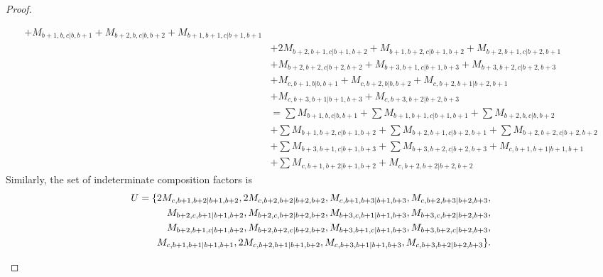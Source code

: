 \begin{proof}
\begin{enumerate}
\begin{enumerate}
\begin{equation}
\begin{aligned}
+ M_{b+1,b,c|b,b+1}
+ M_{b+2,b,c|b,b+2}
+ M_{b+1,b+1,c|b+1,b+1}\\
                                              &
+ 2M_{b+2,b+1,c|b+1,b+2}
+ M_{b+1,b+2,c|b+1,b+2}
+ M_{b+2,b+1,c|b+2,b+1}\\
                                              &
+ M_{b+2,b+2,c|b+2,b+2}
+ M_{b+3,b+1,c|b+1,b+3}
+ M_{b+3,b+2,c|b+2,b+3}\\
                                              &
+ M_{c,b+1,b|b,b+1}
+ M_{c,b+2,b|b,b+2}
+ M_{c,b+2,b+1|b+2,b+1}\\
                                              &
+ M_{c,b+3,b+1|b+1,b+3}
+ M_{c,b+3,b+2|b+2,b+3} \\
                                               &=
\sum M_{b+1,b,c|b,b+1}
+ \sum M_{b+1,b+1,c|b+1,b+1}
+ \sum M_{b+2,b,c|b,b+2}\\
                                              &
+ \sum M_{b+1,b+2,c|b+1,b+2}
+ \sum M_{b+2,b+1,c|b+2,b+1}
+ \sum M_{b+2,b+2,c|b+2,b+2}\\
                                              &
+ \sum M_{b+3,b+1,c|b+1,b+3}
+ \sum M_{b+3,b+2,c|b+2,b+3}
+  M_{c,b+1,b+1|b+1,b+1}\\
                                              &
+ \sum M_{c,b+1,b+2|b+1,b+2}
+  M_{c,b+2,b+2|b+2,b+2}
          \end{aligned}
        \end{equation}
      Similarly, the set of indeterminate composition factors is 
\begin{equation}\notag
  \begin{aligned}
    U = \{
2M_{c,b+1,b+2|b+1,b+2},
2M_{c,b+2,b+2|b+2,b+2},
M_{c,b+1,b+3|b+1,b+3},
M_{c,b+2,b+3|b+2,b+3},\\
M_{b+2,c,b+1|b+1,b+2},
M_{b+2,c,b+2|b+2,b+2},
M_{b+3,c,b+1|b+1,b+3},
M_{b+3,c,b+2|b+2,b+3},\\
M_{b+2,b+1,c|b+1,b+2},
M_{b+2,b+2,c|b+2,b+2},
M_{b+3,b+1,c|b+1,b+3},
M_{b+3,b+2,c|b+2,b+3},\\
M_{c,b+1,b+1|b+1,b+1},
2M_{c,b+2,b+1|b+1,b+2},
M_{c,b+3,b+1|b+1,b+3},
M_{c,b+3,b+2|b+2,b+3}
\}.
  \end{aligned}
\end{equation}
      

\end{enumerate}
\end{enumerate}
\end{proof}
